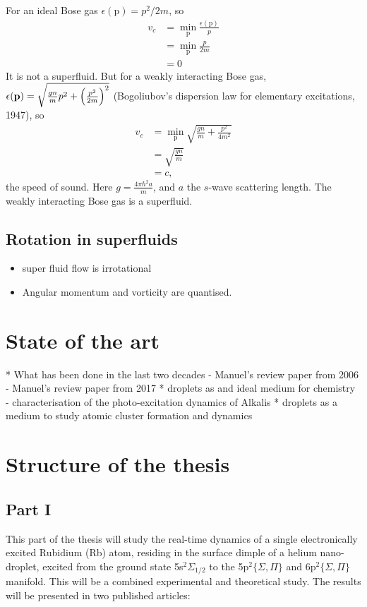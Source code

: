 \documentclass[11pt,a4paper,twoside]{article}
\renewcommand{\vec}[1]{\bm{\mathrm{#1}}}
\begin{document}
			For an ideal Bose gas $\epsilon(\vec{p})=p^2/2m$, so 
			\begin{align}
				v_c &= \min_{\vec{p}}\frac{\epsilon(\vec{p})}{p} \\
					&= \min_{\vec{p}}\frac{p}{2m} \\
					&= 0
			\end{align}
			It is not a superfluid. But for a weakly interacting Bose gas, $\epsilon(\vec{p})=\sqrt{\frac{gn}{m}p^2+\qty(\frac{p^2}{2m})^2}$ (Bogoliubov's dispersion law for elementary excitations, 1947), so
			\begin{align}
				v_c &=\min_{\vec{p}}\sqrt{\frac{gn}{m}+\frac{p^2}{4m^2}} \\
					&= \sqrt{\frac{gn}{m}} \\
					&= c,
			\end{align}
			the speed of sound. Here $g=\frac{4\pi\hbar^2a}{m}$, and $a$ the $s$-wave scattering length. The weakly interacting Bose gas is a superfluid.	
			
		\subsection{Rotation in superfluids}
			\begin{itemize}
				\item super fluid flow is irrotational
				\item Angular momentum and vorticity are quantised.
			\end{itemize}
			
	\section{State of the art}
		* What has been done in the last two decades
			- Manuel's review paper from 2006
			- Manuel's review paper from 2017
		* droplets as and ideal medium for chemistry
			- characterisation of the photo-excitation dynamics of Alkalis
		* droplets as a medium to study atomic cluster formation and dynamics

	\section{Structure of the thesis}
		\subsection{Part I}
			This part of the thesis will study the real-time dynamics of a single electronically excited Rubidium (Rb) atom, residing in the surface dimple of a helium nano-droplet, excited from the ground state 5s$^2\Sigma_{1/2}$ to the 5p$^2\{\Sigma,\Pi\}$ and 6p$^2\{\Sigma,\Pi\}$ manifold. This will be a combined experimental and theoretical study. The results will be presented in two published articles:
		
\end{document}
